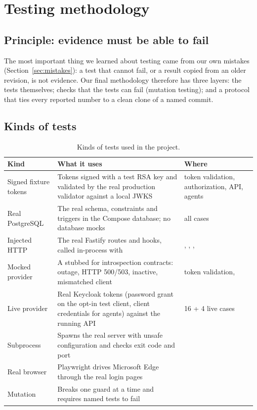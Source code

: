 \section{Testing methodology}
\label{sec:testing}

\subsection{Principle: evidence must be able to fail}
The most important thing we learned about testing came from our own mistakes (Section~\ref{sec:mistakes}): a test that cannot fail, or a result copied from an older revision, is not evidence. Our final methodology therefore has three layers: the tests themselves; checks that the tests can fail (mutation testing); and a protocol that ties every reported number to a clean clone of a named commit.

\subsection{Kinds of tests}
\begin{table}[H]
\centering
\small
\begin{tabularx}{\textwidth}{@{}P{3.3cm} L P{3.6cm}@{}}
\toprule
\textbf{Kind} & \textbf{What it uses} & \textbf{Where}\\
\midrule
Signed fixture tokens & Tokens signed with a test RSA key and validated by the real production validator against a local JWKS & token validation, authorization, API, agents\\
Real PostgreSQL & The real schema, constraints and triggers in the Compose database; no database mocks & all  cases\\
Injected HTTP & The real Fastify routes and hooks, called in-process with  & , , , \\
Mocked provider & A stubbed  for introspection contracts: outage, HTTP 500/503, inactive, mismatched client & token validation, \\
Live provider & Real Keycloak tokens (password grant on the opt-in test client, client credentials for agents) against the running API & 16 + 4 live cases\\
Subprocess & Spawns the real server with unsafe configuration and checks exit code and port & \\
Real browser & Playwright drives Microsoft Edge through the real login pages & \\
Mutation & Breaks one guard at a time and requires named tests to fail & \\
\bottomrule
\end{tabularx}
\caption{Kinds of tests used in the project.}
\end{table}

